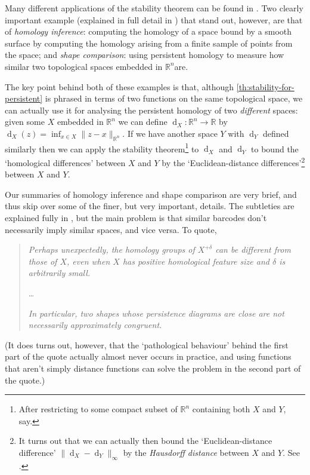 \documentclass[12pt]{article}
\numberwithin{equation}{subsection}
\numberwithin{theorem}{subsection}
\numberwithin{lemma}{subsection}
\numberwithin{corollary}{subsection}
\numberwithin{definition}{subsection}
\numberwithin{example}{subsection}
\numberwithin{note}{subsection}
\newcommand{\rr}{\mathbb{R}}
\DeclareMathOperator{\dist}{d}
\begin{document}
            Many different applications of the stability theorem can be found in \cite[\S6]{Edelsbrunner:2008gf}.
            Two clearly important example (explained in full detail in \cite[\S4]{CohenSteiner:2007is}) that stand out, however, are that of \emph{homology inference}: computing the homology of a space bound by a smooth surface by computing the homology arising from a finite sample of points from the space; and \emph{shape comparison}: using persistent homology to measure how similar two topological spaces embedded in $\rr^n $are.

            The key point behind both of these examples is that, although \cref{th:stability-for-persistent} is phrased in terms of two functions on the same topological space, we can actually use it for analysing the persistent homology of two \emph{different} spaces: given some $X$ embedded in $\rr^n$ we can define $\dist_X\colon\rr^n\to\rr$ by $\dist_X(z)=\inf_{x\in X}\|z-x\|_{\rr^n}$.
            If we have another space $Y$ with $\dist_Y$ defined similarly then we can apply the stability theorem\footnote{
                After restricting to some compact subset of $\rr^n$ containing both $X$ and $Y$, say.
            } to $\dist_X$ and $\dist_Y$ to bound the `homological differences' between $X$ and $Y$ by the `Euclidean-distance differences'\footnote{
                It turns out that we can actually then bound the `Euclidean-distance difference' $\|\dist_X-\dist_Y\|_\infty$ by the \emph{Hausdorff distance} between $X$ and $Y$.
                See \cite[\S6]{Edelsbrunner:2008gf}.
            } between $X$ and $Y$.

            \begin{note}
                Our summaries of homology inference and shape comparison are very brief, and thus skip over some of the finer, but very important, details.
                The subtleties are explained fully in \cite[\S4]{CohenSteiner:2007is}, but the main problem is that similar barcodes don't necessarily imply similar spaces, and vice versa.
                To quote,
                \begin{quotation}
                    \emph{Perhaps unexpectedly, the homology groups of $X^{+\delta}$ can be different from those of $X$, even when $X$ has positive homological feature size and $\delta$ is arbitrarily small.}

                    \ldots
                    
                    \emph{In particular, two shapes whose persistence diagrams are close are not necessarily approximately congruent.}
                \end{quotation}
                (It does turns out, however, that the `pathological behaviour' behind the first part of the quote actually almost never occurs in practice, and using functions that aren't simply distance functions can solve the problem in the second part of the quote.)
            \end{note}
\end{document}
